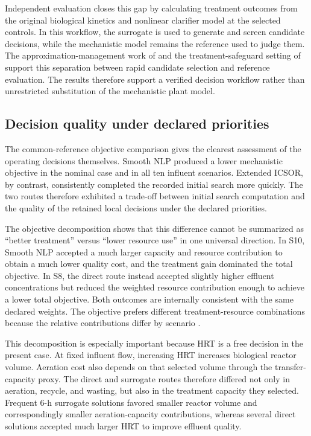 Independent evaluation closes this gap by calculating treatment outcomes from the original biological kinetics and nonlinear clarifier model at the selected controls. In this workflow, the surrogate is used to generate and screen candidate decisions, while the mechanistic model remains the reference used to judge them. The approximation-management work of \citet{Hameed2026} and the treatment-safeguard setting of \citet{Ren2026} support this separation between rapid candidate selection and reference evaluation. The results therefore support a verified decision workflow rather than unrestricted substitution of the mechanistic plant model.

\subsection{Decision quality under declared priorities}

The common-reference objective comparison gives the clearest assessment of the operating decisions themselves. Smooth NLP produced a lower mechanistic objective in the nominal case and in all ten influent scenarios. Extended ICSOR, by contrast, consistently completed the recorded initial search more quickly. The two routes therefore exhibited a trade-off between initial search computation and the quality of the retained local decisions under the declared priorities.

The objective decomposition shows that this difference cannot be summarized as ``better treatment'' versus ``lower resource use'' in one universal direction. In S10, Smooth NLP accepted a much larger capacity and resource contribution to obtain a much lower quality cost, and the treatment gain dominated the total objective. In S8, the direct route instead accepted slightly higher effluent concentrations but reduced the weighted resource contribution enough to achieve a lower total objective. Both outcomes are internally consistent with the same declared weights. The objective prefers different treatment-resource combinations because the relative contributions differ by scenario \citep{PadronPaez2020,Aboagye2021}.

This decomposition is especially important because HRT is a free decision in the present case. At fixed influent flow, increasing HRT increases biological reactor volume. Aeration cost also depends on that selected volume through the transfer-capacity proxy. The direct and surrogate routes therefore differed not only in aeration, recycle, and wasting, but also in the treatment capacity they selected. Frequent 6-h surrogate solutions favored smaller reactor volume and correspondingly smaller aeration-capacity contributions, whereas several direct solutions accepted much larger HRT to improve effluent quality.

